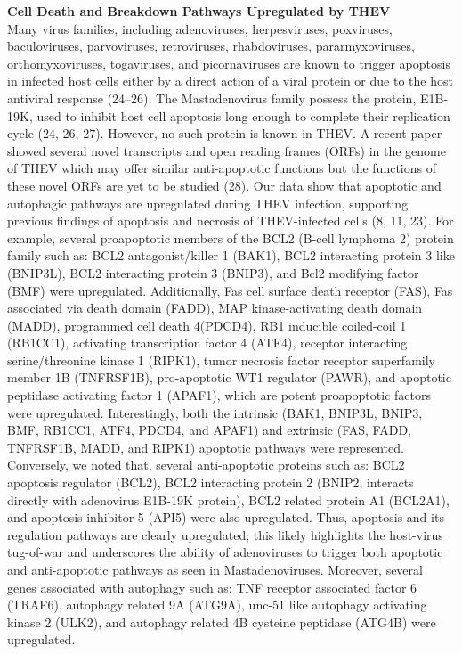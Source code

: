 \documentclass[
]{article}
\begin{document}
\textbf{Cell Death and Breakdown Pathways Upregulated by THEV}\\
Many virus families, including adenoviruses, herpesviruses, poxviruses,
baculoviruses, parvoviruses, retroviruses, rhabdoviruses,
pararmyxoviruses, orthomyxoviruses, togaviruses, and picornaviruses are
known to trigger apoptosis in infected host cells either by a direct
action of a viral protein or due to the host antiviral response
(24--26). The Mastadenovirus family possess the protein, E1B-19K, used
to inhibit host cell apoptosis long enough to complete their replication
cycle (24, 26, 27). However, no such protein is known in THEV. A recent
paper showed several novel transcripts and open reading frames (ORFs) in
the genome of THEV which may offer similar anti-apoptotic functions but
the functions of these novel ORFs are yet to be studied (28). Our data
show that apoptotic and autophagic pathways are upregulated during THEV
infection, supporting previous findings of apoptosis and necrosis of
THEV-infected cells (8, 11, 23). For example, several proapoptotic
members of the BCL2 (B-cell lymphoma 2) protein family such as: BCL2
antagonist/killer 1 (BAK1), BCL2 interacting protein 3 like (BNIP3L),
BCL2 interacting protein 3 (BNIP3), and Bcl2 modifying factor (BMF) were
upregulated. Additionally, Fas cell surface death receptor (FAS), Fas
associated via death domain (FADD), MAP kinase-activating death domain
(MADD), programmed cell death 4(PDCD4), RB1 inducible coiled-coil 1
(RB1CC1), activating transcription factor 4 (ATF4), receptor interacting
serine/threonine kinase 1 (RIPK1), tumor necrosis factor receptor
superfamily member 1B (TNFRSF1B), pro-apoptotic WT1 regulator (PAWR),
and apoptotic peptidase activating factor 1 (APAF1), which are potent
proapoptotic factors were upregulated. Interestingly, both the intrinsic
(BAK1, BNIP3L, BNIP3, BMF, RB1CC1, ATF4, PDCD4, and APAF1) and extrinsic
(FAS, FADD, TNFRSF1B, MADD, and RIPK1) apoptotic pathways were
represented. Conversely, we noted that, several anti-apoptotic proteins
such as: BCL2 apoptosis regulator (BCL2), BCL2 interacting protein 2
(BNIP2; interacts directly with adenovirus E1B-19K protein), BCL2
related protein A1 (BCL2A1), and apoptosis inhibitor 5 (API5) were also
upregulated. Thus, apoptosis and its regulation pathways are clearly
upregulated; this likely highlights the host-virus tug-of-war and
underscores the ability of adenoviruses to trigger both apoptotic and
anti-apoptotic pathways as seen in Mastadenoviruses. Moreover, several
genes associated with autophagy such as: TNF receptor associated factor
6 (TRAF6), autophagy related 9A (ATG9A), unc-51 like autophagy
activating kinase 2 (ULK2), and autophagy related 4B cysteine peptidase
(ATG4B) were upregulated.
\end{document}
